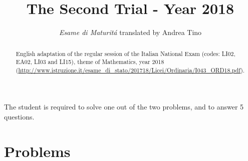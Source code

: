 \documentclass[a4paper,12pt,reqno]{amsart}
\title{The Second Trial - Year 2018}
\author{\emph{Esame di Maturit\'a} translated by Andrea Tino}
\theoremstyle{definition}
\begin{document}
\begin{abstract}
English adaptation of the regular session of the Italian National Exam
(codes: LI02, EA02, LI03 and LI15), theme of Mathematics, year 2018 
(\url{http://www.istruzione.it/esame_di_stato/201718/Licei/Ordinaria/I043\_ORD18.pdf}).
\end{abstract}

\maketitle
\thispagestyle{empty}

The student is required to solve one out of the two problems, and to answer 5 questions. 

\section{Problems}
\end{document}
